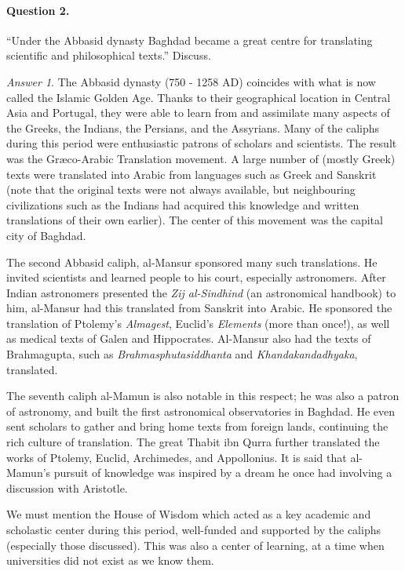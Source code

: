 \documentclass[11pt]{article}
\theoremstyle{remark}
\newtheorem*{answer}{Answer}
\begin{document}
    \paragraph{Question 2.} ``Under the Abbasid dynasty Baghdad became a great centre
    for translating scientific and philosophical texts.'' Discuss.
    \begin{answer}
        The Abbasid dynasty (750 - 1258 AD) coincides with what is now called the
        Islamic Golden Age. Thanks to their geographical location in Central Asia and
        Portugal, they were able to learn from and assimilate many aspects of the
        Greeks, the Indians, the Persians, and the Assyrians. Many of the caliphs
        during this period were enthusiastic patrons of scholars and scientists. The
        result was the Gr\ae co-Arabic Translation movement. A large number of
        (mostly Greek) texts were translated into Arabic from languages such as Greek
        and Sanskrit (note that the original texts were not always available, but
        neighbouring civilizations such as the Indians had acquired this knowledge
        and written translations of their own earlier). The center of this movement
        was the capital city of Baghdad.

        The second Abbasid caliph, al-Mansur sponsored many such translations. He
        invited scientists and learned people to his court, especially astronomers.
        After Indian astronomers presented the \emph{Zij al-Sindhind} (an
        astronomical handbook) to him, al-Mansur had this translated from Sanskrit
        into Arabic. He sponsored the translation of Ptolemy's \emph{Almagest},
        Euclid's \emph{Elements} (more than once!), as well as medical texts of Galen
        and Hippocrates. Al-Mansur also had the texts of Brahmagupta, such as
        \emph{Brahmasphutasiddhanta} and \emph{Khandakandadhyaka}, translated.  

        The seventh caliph al-Mamun is also notable in this respect; he was also a
        patron of astronomy, and built the first astronomical observatories in
        Baghdad. He even sent scholars to gather and bring home texts from foreign
        lands, continuing the rich culture of translation. The great Thabit ibn Qurra
        further translated the works of Ptolemy, Euclid, Archimedes, and Appollonius.
        It is said that al-Mamun's pursuit of knowledge was inspired by a dream he
        once had involving a discussion with Aristotle.

        We must mention the House of Wisdom which acted as a key academic and
        scholastic center during this period, well-funded and supported by the
        caliphs (especially those discussed). This was also a center of learning, at
        a time when universities did not exist as we know them.


\end{answer}
\end{document}
